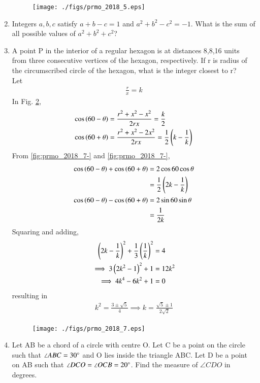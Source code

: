 \documentclass[journal,12pt,twocolumn]{IEEEtran}
\begin{document}
\begin{enumerate}[label=\arabic*]
\begin{figure}[!ht]
\centering
\texttt{[image: ./figs/prmo\_2018\_5.eps]}
\caption{}
\label{fig:prmo_2018_5}
\end{figure}
\item  Integers $a, b, c$ satisfy $a + b - c =1$ and $a^2 + b^2 - c^2 =-1$. What is the sum of all possible values of $a^2 + b^2 + c^2$?

\item A point P in the interior of a regular hexagon is at distances 8,8,16 units from three consecutive vertices of the hexagon, respectively. If r is radius of the circumscribed circle of the hexagon, what is the integer closest to r? 
\\
\solution Let
\begin{align}
\frac{r}{x} = k
\end{align}
In Fig. \ref{fig:prmo_2018_7},
\begin{align}
\label{fig:prmo_2018_7-}
\cos\brak{60-\theta} &= \frac{r^2+x^2-x^2}{2rx} = \frac{k}{2}
\\
\cos\brak{60+\theta} &= \frac{r^2+x^2-2x^2}{2rx} = \frac{1}{2}\brak{k - \frac{1}{k}}
\label{fig:prmo_2018_7+}
\end{align}
%
From \eqref{fig:prmo_2018_7-} and \eqref{fig:prmo_2018_7-},
\begin{align}
\label{fig:prmo_2018_7cos+}
\cos\brak{60-\theta} + \cos\brak{60+\theta}&=  2\cos60\cos\theta 
\nonumber \\
&=\frac{1}{2}\brak{2k - \frac{1}{k}}
\\
\cos\brak{60-\theta} - \cos\brak{60+\theta}&=   2\sin60\sin\theta
\nonumber \\
&=\frac{1}{2k}
\label{fig:prmo_2018_7cos-}
\end{align}
%
Squaring and adding, 
\begin{align}
\left(2k - \frac{1}{k}\right)^2+\frac{1}{3}\left(\frac{1}{k}\right)^2 &= 4
\\
\implies 3\left(2k^2 - 1\right)^2+1 &= 12k^2
\\
\implies 4k^4 -6k^2+1&= 0
\end{align}
resulting in 
\begin{align}
k^2 = \frac{3\pm \sqrt{5}}{4}\implies k =\frac{\sqrt{5}\pm 1}{2\sqrt{2}}
\end{align}
\begin{figure}[!ht]
\centering
\texttt{[image: ./figs/prmo\_2018\_7.eps]}
\caption{}
\label{fig:prmo_2018_7}
\end{figure}
\item  Let AB be a chord of a circle with centre O. Let C be a point on the circle such that $\angle ABC = 30\degree$  and O lies inside the triangle ABC. Let D be a point on AB such that $\angle DCO = \angle OCB = 20\degree$. Find the measure of $\angle CDO$ in degrees. 

\end{enumerate}
\end{document}
